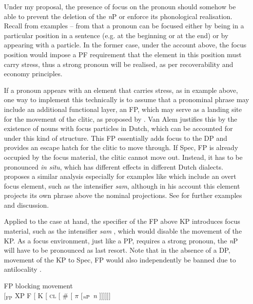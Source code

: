 \documentclass[output=paper,colorlinks,citecolor=brown]{langscibook}
\begin{document}
Under my proposal, the presence of focus on the pronoun should somehow be able to prevent the deletion of the \textit{n}P or enforce its phonological realisation. Recall from examples -- from  that a pronoun can be focused either by being in a particular position in a sentence (e.g. at the beginning or at the end) or by appearing with a particle. In the former case, under the account above, the focus position would impose a PF requirement that the element in this position must carry stress, thus a strong pronoun will be realised, as per recoverability and economy principles. 

If a pronoun appears with an element that carries stress, as in example  above, one way to implement this technically is to assume that a pronominal phrase may include an additional functional layer, an FP, which may serve as a landing site for the movement of the clitic, as proposed by \citet{vanalem22}. Van Alem justifies this by the existence of nouns with focus particles in Dutch, which can be accounted for under this kind of structure. This FP essentially adds focus to the DP and provides an escape hatch for the clitic to move through. If Spec, FP is already occupied by the focus material, the clitic cannot move out. Instead, it has to be pronounced \textit{in situ}, which has different effects in different Dutch dialects. \citet[217]{despic11} proposes a similar analysis especially for examples like  which include an overt focus element, such as the intensifier \textit{sam}, although in his account this element projects its own phrase above the nominal projections. See \citet{despic11} for further examples and discussion.

Applied to the case at hand, the specifier of the FP above KP introduces focus material, such as the intensifier \textit{sam} , which would disable the movement of the KP. As a focus environment, just like a PP, requires a strong pronoun, the \textit{n}P will have to be pronounced as last resort. Note that in the absence of a DP, movement of the KP to Spec, FP would also independently be banned due to antilocality \citep{abels-phases}. 

\ea \label{derivpronmovementblockfp}  FP blocking movement \\
$[$$_\text{FP}$ XP F 
[ K 
[ \textsc{cl} 
[ \# 
[ $\pi$ 
[$_\text{\textit{n}P}$ \textit{n} ]]]]]]
\z
\vspace{0.5cm}
\end{document}
